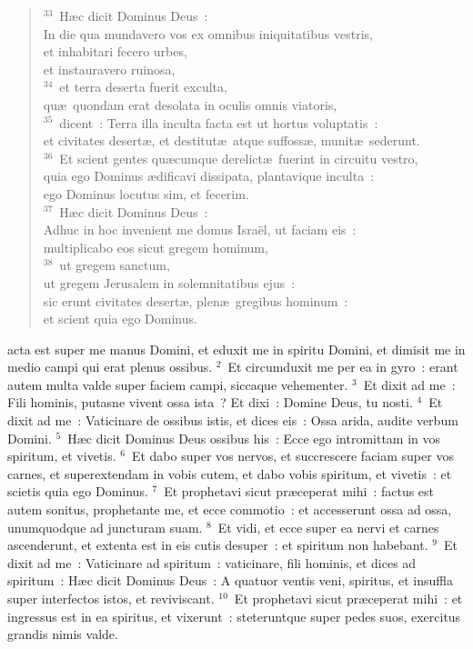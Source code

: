 \begin{flushleft}\begin{verse}${}^{33}$~H\ae c dicit Dominus Deus~:\\ In die qua mundavero vos ex omnibus iniquitatibus vestris,\\ et inhabitari fecero urbes,\\ et instauravero ruinosa,\\
${}^{34}$~et terra deserta fuerit exculta,\\ qu\ae\ quondam erat desolata in oculis omnis viatoris,\\
${}^{35}$~dicent~: Terra illa inculta facta est ut hortus voluptatis~:\\ et civitates desert\ae , et destitut\ae\ atque suffoss\ae , munit\ae\ sederunt.\\
${}^{36}$~Et scient gentes qu\ae cumque derelict\ae\ fuerint in circuitu vestro,\\ quia ego Dominus \ae dificavi dissipata, plantavique inculta~:\\ ego Dominus locutus sim, et fecerim.\\
${}^{37}$~H\ae c dicit Dominus Deus~:\\ Adhuc in hoc invenient me domus Isra\"el, ut faciam eis~:\\ multiplicabo eos sicut gregem hominum,\\
${}^{38}$~ut gregem sanctum,\\ ut gregem Jerusalem in solemnitatibus ejus~:\\ sic erunt civitates desert\ae , plen\ae\ gregibus hominum~:\\ et scient quia ego Dominus.\end{verse}\end{flushleft}



\bchapter
{}acta est super me manus Domini, et eduxit me in spiritu Domini, et dimisit me in medio campi qui erat plenus ossibus.
${}^{2}$~Et circumduxit me per ea in gyro~: erant autem multa valde super faciem campi, siccaque vehementer.
${}^{3}$~Et dixit ad me~: Fili hominis, putasne vivent ossa ista~? Et dixi~: Domine Deus, tu nosti.
${}^{4}$~Et dixit ad me~: Vaticinare de ossibus istis, et dices eis~: Ossa arida, audite verbum Domini.
${}^{5}$~H\ae c dicit Dominus Deus ossibus his~: Ecce ego intromittam in vos spiritum, et vivetis.
${}^{6}$~Et dabo super vos nervos, et succrescere faciam super vos carnes, et superextendam in vobis cutem, et dabo vobis spiritum, et vivetis~: et scietis quia ego Dominus.
${}^{7}$~Et prophetavi sicut pr\ae ceperat mihi~: factus est autem sonitus, prophetante me, et ecce commotio~: et accesserunt ossa ad ossa, unumquodque ad juncturam suam.
${}^{8}$~Et vidi, et ecce super ea nervi et carnes ascenderunt, et extenta est in eis cutis desuper~: et spiritum non habebant.
${}^{9}$~Et dixit ad me~: Vaticinare ad spiritum~: vaticinare, fili hominis, et dices ad spiritum~: H\ae c dicit Dominus Deus~: A quatuor ventis veni, spiritus, et insuffla super interfectos istos, et reviviscant.
${}^{10}$~Et prophetavi sicut pr\ae ceperat mihi~: et ingressus est in ea spiritus, et vixerunt~: steteruntque super pedes suos, exercitus grandis nimis valde.


